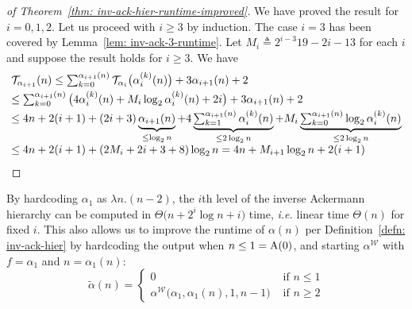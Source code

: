 \begin{proof}[of Theorem~\ref{thm: inv-ack-hier-runtime-improved}]
	We have proved the result for $i = 0, 1, 2$. Let us proceed with $i\ge 3$ by induction. The case $i = 3$ has been covered by Lemma~\ref{lem: inv-ack-3-runtime}. Let $M_i \triangleq 2^{i-3}19 - 2i - 13$ for each $i$ and suppose the result holds for $i\ge 3$. We have
	\begin{equation*}
	\begin{array}{@{}l@{}}
	 \runtime_{\alpha_{i+1}}(n) \le \sum_{k=0}^{\alpha_{i+1}(n)} \runtime_{\alpha_i}\big(\alpha_i^{(k)}(n)\big) + 3\alpha_{i+1}(n) + 2 \\[3pt]
	\le \sum_{k=0}^{\alpha_{i+1}(n)}\big(4\alpha_i^{(k)}(n) + M_i\log_2\alpha_i^{(k)}(n) + 2i \big) + 3\alpha_{i+1}(n) + 2 \\[3pt]
  \le 4n + 2(i+1) + (2i + 3)\underbrace{\alpha_{i+1}(n)}_{\le \log_2n} + 4\underbrace{\textstyle \sum_{k=1}^{\alpha_{i+1}(n)}\alpha_i^{(k)}(n)}_{\le 2\log_2n} + M_i\underbrace{\textstyle \sum_{k=0}^{\alpha_{i+1}(n)}\log_2\alpha_i^{(k)}(n)}_{\le 2\log_2n} \\[3pt]
	\le 4n + 2(i+1) + (2M_i + 2i + 3 + 8)\log_2n
	= 4n + M_{i+1}\log_2n + 2(i+1)
	\end{array}
	\end{equation*}
\end{proof}
By hardcoding $\alpha_1$ as $\lambda n.(n-2)$, the $i$th level of the inverse Ackermann hierarchy can be computed in $\Theta\big(n + 2^i\log n  + i\big)$ time, \emph{i.e.} linear time $\Theta(n)$ for fixed $i$.
This also allows us to improve the runtime of $\alpha(n)$ per Definition~\ref{defn: inv-ack-hier} by hardcoding the output when $n\le 1 = \text{A}(0)$, and starting $\alpha^{\mathcal{W}}$ with $f = \alpha_1$ and $n = \alpha_1(n)$:
\begin{equation*}
\tilde{\alpha}(n) = \begin{cases}
0 & \text{ if } n \le 1 \\ \alpha^{\mathcal{W}}\big(\alpha_1, \alpha_1(n), 1, n-1\big) & \text{ if } n \ge 2
\end{cases}
\end{equation*}
